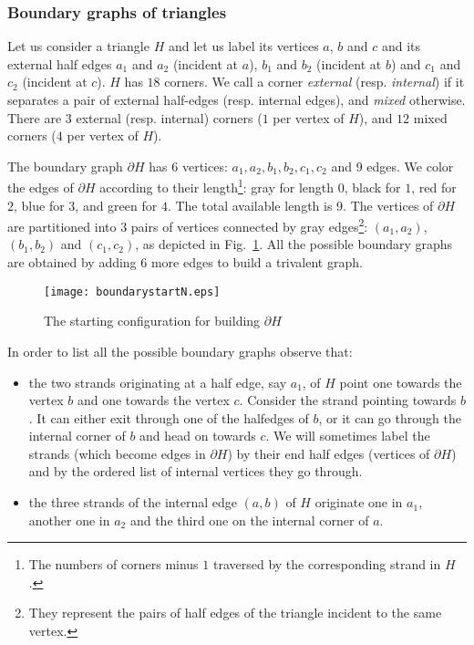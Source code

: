 \documentclass[10pt]{article}
\theoremstyle{plain}
\theoremstyle{definition}
\begin{document}
 \subsubsection{Boundary graphs of triangles}
 
 Let us consider a triangle $H$ and let us label its vertices $a$, $b$ and $c$ and its external half edges $a_1$ and $a_2$ (incident at $a$), 
 $b_1$ and $b_2$ (incident at $b$) and  $c_1$ and $c_2$ (incident at $c$). $H$ has $18$ corners. We call a 
 corner \emph{external} (resp. \emph{internal}) if it separates a pair of external half-edges (resp. internal edges), and \emph{mixed} otherwise. 
There are $3$ external (resp. internal) corners ($1$ per vertex of $H$), and $12$ mixed corners ($4$ per vertex of $H$).

The boundary graph $\partial H$ has 6 vertices: $a_1,a_2,b_1,b_2,c_1,c_2$ and 9 edges. 
We color the edges of $\partial H$ according to their length\footnote{The numbers of corners minus $1$ traversed by the corresponding strand in $H$.}: 
gray for length $0$, black for $1$, red for $2$, blue for $3$, and green for $4$. 
The total available length is 9. The vertices of $\partial H$ are partitioned into 3 pairs of vertices connected 
by gray edges\footnote{They represent the pairs of half edges of the triangle incident to the same vertex.}: 
$(a_1,a_2)$, $(b_1,b_2)$ and $(c_1,c_2)$, as depicted in Fig.~\ref{fig:boundarystart}. All the possible boundary graphs are obtained by adding 6 more edges to build a trivalent graph.
\begin{figure}[htb]
 \begin{center}
 \texttt{[image: boundarystartN.eps]}  
 \caption{The starting configuration for building $\partial H$} \label{fig:boundarystart}
 \end{center}
 \end{figure}

 In order to list all the possible boundary graphs observe that:
 \begin{itemize}
  \item the two strands originating at a half edge, say $a_1$, of $H$ point one towards the vertex $b$ and one towards the vertex $c$. Consider the strand pointing towards $b$. It 
 can either exit through one of the halfedges of $b$, or it can go through the internal corner of $b$ and head on towards $c$. 
 We will sometimes label the strands (which become edges in $\partial H$) by their end half edges (vertices of $\partial H$) and by the ordered list of internal vertices they go through.
 \item the three strands of the internal edge $(a,b)$ of $H$ originate one in $a_1$, another one in $a_2$ and the third one on the internal corner of $a$.
 \end{itemize}
 
\end{document}
